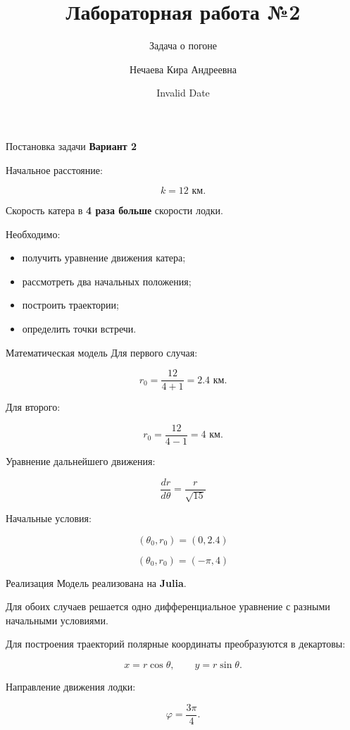 \documentclass[
  ignorenonframetext,
  aspectratio=169,
  russian,
]{beamer}
\title{\texorpdfstring{Лабораторная работа №2}{Лабораторная работа №2}}
\subtitle{\texorpdfstring{Задача о погоне}{Задача о погоне}}
\author{Нечаева Кира Андреевна}
\date{Invalid Date}
\institute{НКНбд-01-23}
\providecommand{\tightlist}{%
  \setlength{\itemsep}{0pt}\setlength{\parskip}{0pt}}
\begin{document}
\frame{\titlepage}


\begin{frame}{Постановка задачи}
\protect{}\label{ux43fux43eux441ux442ux430ux43dux43eux432ux43aux430-ux437ux430ux434ux430ux447ux438}
\textbf{Вариант 2}

Начальное расстояние:

\[
k=12\text{ км}.
\]

Скорость катера в \textbf{4 раза больше} скорости лодки.

Необходимо:

\begin{itemize}
\tightlist
\item
  получить уравнение движения катера;
\item
  рассмотреть два начальных положения;
\item
  построить траектории;
\item
  определить точки встречи.
\end{itemize}
\end{frame}

\begin{frame}{Математическая модель}
\protect{}\label{ux43cux430ux442ux435ux43cux430ux442ux438ux447ux435ux441ux43aux430ux44f-ux43cux43eux434ux435ux43bux44c}
Для первого случая:

\[
r_0=\frac{12}{4+1}=2.4\text{ км}.
\]

Для второго:

\[
r_0=\frac{12}{4-1}=4\text{ км}.
\]

Уравнение дальнейшего движения:

\[
\boxed{
\frac{dr}{d\theta}=\frac{r}{\sqrt{15}}
}
\]

Начальные условия:

\[
(\theta_0,r_0)=(0,2.4)
\]

\[
(\theta_0,r_0)=(-\pi,4)
\]
\end{frame}

\begin{frame}{Реализация}
\protect{}\label{ux440ux435ux430ux43bux438ux437ux430ux446ux438ux44f}
Модель реализована на \textbf{Julia}.

Для обоих случаев решается одно дифференциальное уравнение с разными
начальными условиями.

Для построения траекторий полярные координаты преобразуются в декартовы:

\[
x=r\cos\theta,\qquad
y=r\sin\theta.
\]

Направление движения лодки:

\[
\varphi=\frac{3\pi}{4}.
\]
\end{frame}
\end{document}
